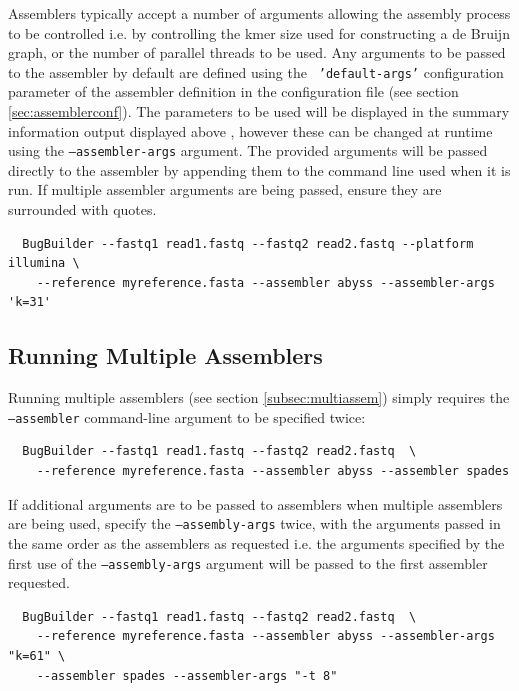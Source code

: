 \documentclass[a4paper,10pt]{article}
\begin{document}
Assemblers typically accept a number of arguments allowing the assembly process
to be controlled i.e. by controlling the kmer size used for constructing a
de Bruijn graph, or the number of parallel threads to be used. Any arguments to
be passed to the assembler by default are defined using the {\tt
'default-args'} configuration parameter of the assembler definition in the
configuration file (see section \ref{sec:assemblerconf}). The parameters to be
used will be displayed in the summary information output displayed above ,
however these can be  changed at runtime using the {\tt --assembler-args}
argument. The provided arguments will be passed directly to the assembler by
appending them to the command line used when it is run. If multiple assembler
arguments are being passed, ensure they are surrounded with quotes. 

\begin{verbatim}
  BugBuilder --fastq1 read1.fastq --fastq2 read2.fastq --platform illumina \
    --reference myreference.fasta --assembler abyss --assembler-args 'k=31'
\end{verbatim}


\subsection{Running Multiple Assemblers}

Running multiple assemblers (see section \ref{subsec:multiassem}) simply
requires the {\tt --assembler} command-line argument to be specified twice:

\begin{verbatim}
  BugBuilder --fastq1 read1.fastq --fastq2 read2.fastq  \
    --reference myreference.fasta --assembler abyss --assembler spades
\end{verbatim}

If additional arguments are to be passed to assemblers when multiple assemblers
are being used, specify the {\tt --assembly-args} twice, with the arguments
passed in the same order as the assemblers as requested i.e. the arguments
specified by the first use of the {\tt --assembly-args} argument will be
passed to the first assembler requested.

\begin{verbatim}
  BugBuilder --fastq1 read1.fastq --fastq2 read2.fastq  \
    --reference myreference.fasta --assembler abyss --assembler-args "k=61" \
    --assembler spades --assembler-args "-t 8"
\end{verbatim}
\end{document}
